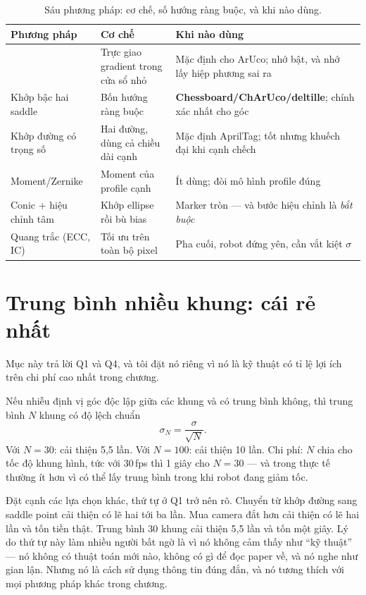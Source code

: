 \documentclass[../../marker.tex]{subfiles}
\begin{document}
\begin{table}[H]\centering\small
\caption{Sáu phương pháp: cơ chế, số hướng ràng buộc, và khi nào dùng.}
\label{tab:b08-pp}
\begin{tabularx}{\linewidth}{@{}L{2.9cm}L{3.2cm}Y@{}}
\toprule
\textbf{Phương pháp} & \textbf{Cơ chế} & \textbf{Khi nào dùng}\\
\midrule
{} \cite{forstner1987fast} & Trực giao gradient trong cửa sổ nhỏ & Mặc định cho ArUco; nhớ bật, và nhớ lấy hiệp phương sai ra\\
Khớp bậc hai saddle \cite{lucchese2002using,chen2018deltille} & Bốn hướng ràng buộc & \textbf{Chessboard/ChArUco/deltille}; chính xác nhất cho góc\\
Khớp đường có trọng số \cite{wang2016apriltag2} & Hai đường, dùng cả chiều dài cạnh & Mặc định AprilTag; tốt nhưng khuếch đại khi cạnh chếch\\
Moment/Zernike \cite{ghosal1993orthogonal} & Moment của profile cạnh & Ít dùng; đòi mô hình profile đúng\\
Conic + hiệu chỉnh tâm \cite{heikkila2000geometric} & Khớp ellipse rồi bù bias & Marker tròn --- và bước hiệu chỉnh là \emph{bắt buộc}\\
Quang trắc (ECC, IC) \cite{evangelidis2008ecc,baker2004lucas} & Tối ưu trên toàn bộ pixel & Pha cuối, robot đứng yên, cần vắt kiệt \(\sigma\)\\
\bottomrule
\end{tabularx}
\end{table}

\section{Trung bình nhiều khung: cái rẻ nhất}

Mục này trả lời Q1 và Q4, và tôi đặt nó riêng vì nó là kỹ thuật có tỉ lệ lợi ích trên chi phí cao nhất trong chương.

Nếu nhiễu định vị góc độc lập giữa các khung và có trung bình không, thì trung bình \(N\) khung có độ lệch chuẩn
\[
\sigma_N = \frac{\sigma}{\sqrt{N}} .
\]
Với \(N = 30\): cải thiện 5,5 lần. Với \(N = 100\): cải thiện 10 lần. Chi phí: \(N\) chia cho tốc độ khung hình, tức với 30\,fps thì 1 giây cho \(N = 30\) --- và trong thực tế thường ít hơn vì có thể lấy trung bình trong khi robot đang giảm tốc.

Đặt cạnh các lựa chọn khác, thứ tự ở Q1 trở nên rõ. Chuyển từ khớp đường sang saddle point cải thiện có lẽ hai tới ba lần. Mua camera đắt hơn cải thiện có lẽ hai lần và tốn tiền thật. Trung bình 30 khung cải thiện 5,5 lần và tốn một giây. Lý do thứ tự này làm nhiều người bất ngờ là vì nó không cảm thấy như ``kỹ thuật'' --- nó không có thuật toán mới nào, không có gì để đọc paper về, và nó nghe như gian lận. Nhưng nó là cách sử dụng thông tin đúng đắn, và nó tương thích với mọi phương pháp khác trong chương.
\end{document}
